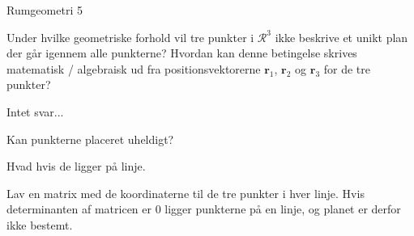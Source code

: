 \documentclass{article}
\begin{document}
\begin{exercise}{Rumgeometri 5}

Under hvilke geometriske forhold vil tre punkter i
$\mathcal{R}^3$ ikke beskrive et unikt plan der går igennem
alle punkterne?
Hvordan kan denne betingelse skrives matematisk / algebraisk
ud fra positionsvektorerne $\mathbf{r}_1$, $\mathbf{r}_2$ og
$\mathbf{r}_3$ for de tre punkter?

Intet svar...

\hint
Kan punkterne placeret uheldigt?

\hint
Hvad hvis de ligger på linje.

\hint
Lav en matrix med de koordinaterne til de tre punkter
i hver linje.
Hvis determinanten af matricen er 0 ligger punkterne på en linje,
og planet er derfor ikke bestemt.

\end{exercise}
\end{document}
